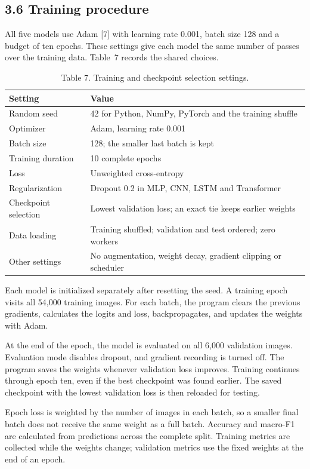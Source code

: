 \subsection{3.6 Training procedure}
All five models use Adam [7] with learning rate 0.001, batch size
128 and a budget of ten epochs. These settings give each model the same number
of passes over the training data. Table~7 records the
shared choices.

\begin{table}[h]
\centering
\caption{Table 7. Training and checkpoint selection settings.}
\label{tab:fresh_training}
\begin{tabularx}{\linewidth}{l X}
\toprule
Setting & Value\\
\midrule
Random seed & 42 for Python, NumPy, PyTorch and the training shuffle\\
Optimizer & Adam, learning rate 0.001\\
Batch size & 128; the smaller last batch is kept\\
Training duration & 10 complete epochs\\
Loss & Unweighted cross-entropy\\
Regularization & Dropout 0.2 in MLP, CNN, LSTM and Transformer\\
Checkpoint selection & Lowest validation loss; an exact tie keeps earlier weights\\
Data loading & Training shuffled; validation and test ordered; zero workers\\
Other settings & No augmentation, weight decay, gradient clipping or scheduler\\
\bottomrule
\end{tabularx}
\end{table}

Each model is initialized separately after resetting the seed. A training epoch
visits all 54,000 training images. For each batch, the program clears the
previous gradients, calculates the logits and loss, backpropagates, and updates
the weights with Adam.

At the end of the epoch, the model is evaluated on all 6,000 validation images.
Evaluation mode disables dropout, and gradient recording is turned off.
The program saves the weights whenever validation loss improves. Training
continues through epoch ten, even if the best checkpoint was found earlier.
The saved checkpoint with the lowest validation loss is then reloaded for
testing.

Epoch loss is weighted by the number of images in each batch, so a smaller final
batch does not receive the same weight as a full batch. Accuracy and macro-F1
are calculated from predictions across the complete split. Training metrics
are collected while the weights change; validation metrics use the fixed
weights at the end of an epoch.

